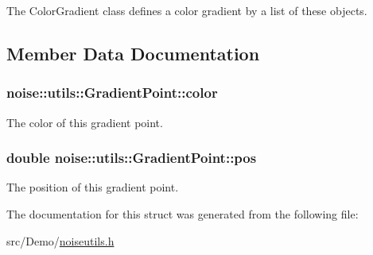 The Color\+Gradient class defines a color gradient by a list of these objects. 

\subsection{Member Data Documentation}
\hypertarget{structnoise_1_1utils_1_1_gradient_point_ab2949090d09f62737077fb26873a9fc8}{
\subsubsection[{color}]{ noise\+::utils\+::\+Gradient\+Point\+::color}}\label{structnoise_1_1utils_1_1_gradient_point_ab2949090d09f62737077fb26873a9fc8}


The color of this gradient point. 

\hypertarget{structnoise_1_1utils_1_1_gradient_point_ab47a3602fe5727745eb01c46068511bb}{
\subsubsection[{pos}]{\setlength{\rightskip}{0pt plus 5cm}double noise\+::utils\+::\+Gradient\+Point\+::pos}}\label{structnoise_1_1utils_1_1_gradient_point_ab47a3602fe5727745eb01c46068511bb}


The position of this gradient point. 



The documentation for this struct was generated from the following file\+:\begin{DoxyCompactItemize}
\item 
src/\+Demo/\hyperlink{_demo_2noiseutils_8h}{noiseutils.\+h}\end{DoxyCompactItemize}
